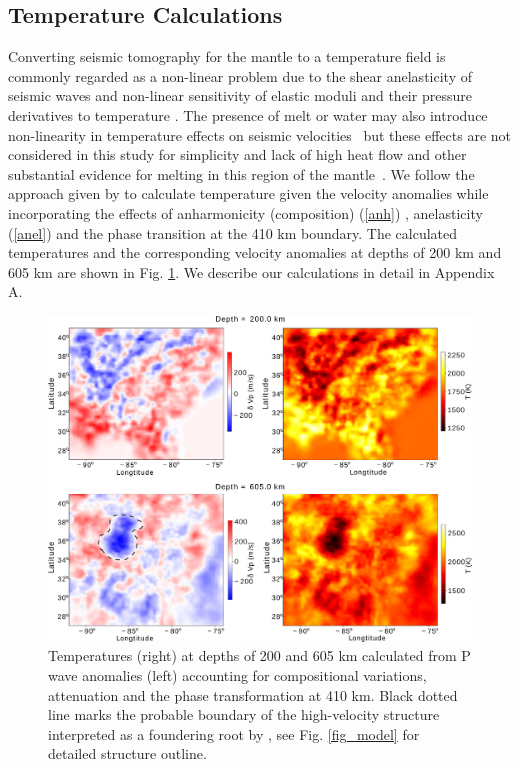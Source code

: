 \documentclass[draft,linenumbers]{agujournal2018}
\begin{document}
\subsection{Temperature Calculations} \label{temp_var}
    Converting seismic tomography for the mantle to a temperature field is commonly regarded as a non-linear problem due to the shear anelasticity of seismic waves \citep{minster1981model, karato1993importance, sobolev1996upper, Goes_2000, artemieva2004shear} and non-linear sensitivity of elastic moduli and their pressure derivatives to temperature \citep{duffy1989seismic, anderson1992high, Cammarano2003, stixrude2005thermodynamics}. The presence of melt or water may also introduce non-linearity in temperature effects on seismic velocities~\citep{Karato_1998} but these effects are not considered in this study for simplicity and lack of high heat flow and other substantial evidence for melting in this region of the  mantle~\citep{blackwell2006assessment}. We follow the approach given by \citet{Cammarano2003} to calculate temperature given the velocity anomalies while incorporating the effects of anharmonicity (composition) (\ref{anh}) , anelasticity (\ref{anel}) and the phase transition at the 410 km boundary. The calculated temperatures and the corresponding velocity anomalies at depths of 200 km and 605 km are shown in Fig. \ref{fig_temp}. We describe our calculations in detail in Appendix A. 
%
\begin{figure}[ht]
    \centering
    \includegraphics[width=0.75\linewidth]{figures/figure_temp.png}
    \caption{Temperatures (right) at depths of 200 and 605 km calculated from P wave anomalies (left) accounting for compositional variations, attenuation and the phase transformation at 410 km. Black dotted line marks the probable boundary of the high-velocity structure interpreted as a foundering root by \citet{Biryol_2016}, see Fig. \ref{fig_model} for detailed structure outline.}
    \label{fig_temp}
 \end{figure}
\end{document}
